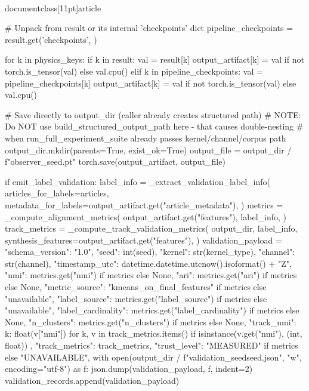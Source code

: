 \\documentclass[11pt]{article}
\begin{document}
\begin{CodeBlock}
        # Unpack from result or its internal 'checkpoints' dict
        pipeline_checkpoints = result.get('checkpoints', {})
        
        for k in physics_keys:
            if k in result:
                val = result[k]
                output_artifact[k] = val if not torch.is_tensor(val) else val.cpu()
            elif k in pipeline_checkpoints:
                val = pipeline_checkpoints[k]
                output_artifact[k] = val if not torch.is_tensor(val) else val.cpu()
                
        # Save directly to output_dir (caller already creates structured path)
        # NOTE: Do NOT use build_structured_output_path here - that causes double-nesting
        # when run_full_experiment_suite already passes kernel/channel/corpus path
        output_dir.mkdir(parents=True, exist_ok=True)
        output_file = output_dir / f"observer_{seed}.pt"
        torch.save(output_artifact, output_file)

        if emit_label_validation:
            label_info = _extract_validation_label_info(
                articles_for_labels=articles,
                metadata_for_labels=output_artifact.get("article_metadata"),
            )
            metrics = _compute_alignment_metrics(
                output_artifact.get("features"),
                label_info,
            )
            track_metrics = _compute_track_validation_metrics(
                output_dir,
                label_info,
                synthesis_features=output_artifact.get("features"),
            )
            validation_payload = {
                "schema_version": "1.0",
                "seed": int(seed),
                "kernel": str(kernel_type),
                "channel": str(channel),
                "timestamp_utc": datetime.datetime.utcnow().isoformat() + "Z",
                "nmi": metrics.get("nmi") if metrics else None,
                "ari": metrics.get("ari") if metrics else None,
                "metric_source": "kmeans_on_final_features" if metrics else "unavailable",
                "label_source": metrics.get("label_source") if metrics else "unavailable",
                "label_cardinality": metrics.get("label_cardinality") if metrics else None,
                "n_clusters": metrics.get("n_clusters") if metrics else None,
                "track_nmi": {
                    k: float(v["nmi"])
                    for k, v in track_metrics.items()
                    if isinstance(v.get("nmi"), (int, float))
                },
                "track_metrics": track_metrics,
                "trust_level": "MEASURED" if metrics else "UNAVAILABLE",
            }
            with open(output_dir / f"validation_seed{seed}.json", "w", encoding="utf-8") as f:
                json.dump(validation_payload, f, indent=2)
            validation_records.append(validation_payload)
        

\end{CodeBlock}
\end{document}
